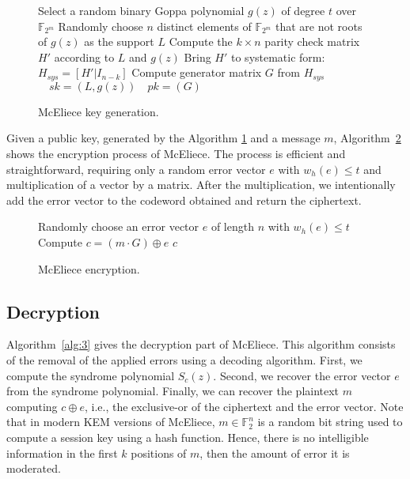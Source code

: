 \begin{figure}[ht]
\centering
\begin{algorithm}[H]
 Select a random binary Goppa polynomial $g(z)$ of degree $t$ over $\mathbb{F}_{2^{m}}$\;
 Randomly choose $n$ distinct elements of $\mathbb{F}_{2^m}$ that are not roots of $g(z)$ as the support $L$\;
 Compute the $k \times n$ parity check matrix $H'$ according to $L$ and $g(z)$\;
 Bring $H'$ to systematic form: $H_{sys} = [H'|I_{n-k}]$\;
 Compute generator matrix $G$ from $H_{sys}$\;
 \Return $\quad sk = (L, g(z)) \quad pk = (G)$\;
 \caption{McEliece key generation.}
 \label{alg:keygen}
\end{algorithm}
\end{figure}

Given a public key, generated by the Algorithm \ref{alg:keygen} and a message $m$, Algorithm~\ref{alg:2} shows the encryption process of McEliece. The process is efficient and straightforward, requiring only a random error vector $e$ with $w_h(e) \leq t$ and multiplication of a vector by a matrix. After the multiplication, we intentionally add the error vector to the codeword obtained and return the ciphertext.

\begin{figure}[ht]
\centering
\begin{algorithm}[H]
Randomly choose  an error vector $e$ of length $n$ with $w_h(e)\leq t$\;
Compute $c = (m\cdot G) \oplus e$\;
\Return $c$\;
\caption{McEliece encryption.}\label{alg:2}
\end{algorithm}
\end{figure}

\subsection{Decryption}
\label{sub:mc-dec}
Algorithm~\ref{alg:3} gives the decryption part of McEliece. This algorithm consists of the removal of the applied errors using a decoding algorithm. First, we compute the syndrome polynomial $S_c(z)$. Second, we recover the error vector $e$ from the syndrome polynomial. Finally, we can recover the plaintext $m$ computing $c \oplus e$, i.e., the exclusive-or of the ciphertext and the error vector. Note that in modern KEM versions of McEliece, $m\in \mathbb{F}^n_{2}$ is a random bit string used to compute a session key using a hash function. Hence, there is no intelligible information in the first $k$ positions of $m$, then the amount of error it is moderated.

